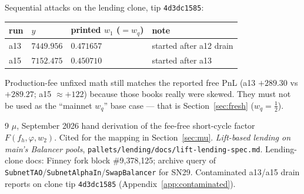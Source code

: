 \documentclass[11pt]{article}
\theoremstyle{definition}
\theoremstyle{remark}
\begin{document}
Sequential attacks on the lending clone, tip \texttt{4d3dc1585}:

\begin{center}
\begin{tabular}{@{}llll@{}}
\toprule
run & $y$ & printed $w_1$ ($=w_q$) & note \\
\midrule
a13 & $7449.956$ & $0.471657$ & started after a12 drain \\
a15 & $7152.475$ & $0.450710$ & started after a13 \\
\bottomrule
\end{tabular}
\end{center}

\noindent Production-fee unfixed math still matches the reported free PnL
(a13 $+289.30$ vs $+289.27$; a15 $\approx +122$) because those books
really were skewed. They must not be used as the ``mainnet $w_q$'' base
case --- that is Section~\ref{sec:fresh} ($w_q=\tfrac12$).

\begin{thebibliography}{9}
$\mu$, September 2026 hand derivation of the fee-free short-cycle
factor $F(f_h,\varphi,w_2)$. Cited for the mapping in
Section~\ref{sec:mu}.
\emph{Lift-based lending on main's Balancer pools},
\texttt{pallets/lending/docs/lift-lending-spec.md}.
Lending-clone docs: Finney fork block \#9,378,125; archive query of
\texttt{SubnetTAO}/\texttt{SubnetAlphaIn}/\texttt{SwapBalancer} for SN29.
Contaminated a13/a15 drain reports on clone tip \texttt{4d3dc1585}
(Appendix~\ref{app:contaminated}).
\end{thebibliography}
\end{document}
